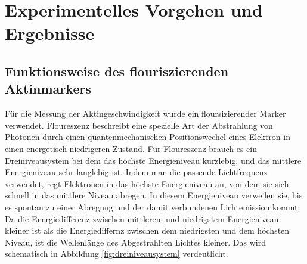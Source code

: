 \section{Experimentelles Vorgehen und Ergebnisse}

\subsection{Funktionsweise des flouriszierenden Aktinmarkers}
Für die Messung der Aktingeschwindigkeit wurde ein floursizierender Marker verwendet.
Floureszenz beschreibt eine spezielle Art der Abstrahlung von
Photonen durch einen quantenmechanischen Positionswechel
eines Elektron in einen energetisch niedrigeren Zustand.
Für Floureszenz brauch es ein Dreiniveausystem bei dem das
höchste Energieniveau kurzlebig, und das mittlere Energieniveau
sehr langlebig ist. Indem man die passende Lichtfrequenz verwendet,
regt Elektronen in das höchste Energieniveau an, von dem sie sich schnell in das
mittlere Niveau abregen. In diesem Energieniveau verweilen sie, bis es spontan zu einer 
Abregung und der damit verbundenen Lichtemission kommt.
Da die Energiedifferenz zwischen mittlerem und niedrigstem Energieniveau kleiner ist als
die Energiediffernz zwischen dem niedrigsten und dem höchsten Niveau, ist die Wellenlänge
des Abgestrahlten Lichtes kleiner. Das wird schematisch in Abbildung
\ref{fig:dreiniveausystem} verdeutlicht.

